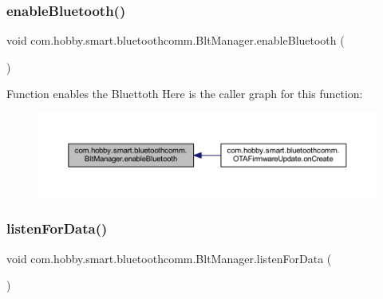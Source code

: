 \subsubsection{\texorpdfstring{enable\+Bluetooth()}{enableBluetooth()}}
{\footnotesize\ttfamily void com.\+hobby.\+smart.\+bluetoothcomm.\+Blt\+Manager.\+enable\+Bluetooth (\begin{DoxyParamCaption}{ }\end{DoxyParamCaption})}

Function enables the Bluettoth Here is the caller graph for this function\+:\nopagebreak
\begin{figure}[H]
\begin{center}
\leavevmode
\includegraphics[width=350pt]{classcom_1_1hobby_1_1smart_1_1bluetoothcomm_1_1_blt_manager_ad44dd68329e449633f69f8d3904f35d7_icgraph}
\end{center}
\end{figure}
\mbox{\label{classcom_1_1hobby_1_1smart_1_1bluetoothcomm_1_1_blt_manager_ab2ec59deffb80584481167ce99ff6b40}} 
\subsubsection{\texorpdfstring{listen\+For\+Data()}{listenForData()}}
{\footnotesize\ttfamily void com.\+hobby.\+smart.\+bluetoothcomm.\+Blt\+Manager.\+listen\+For\+Data (\begin{DoxyParamCaption}{ }\end{DoxyParamCaption})}

